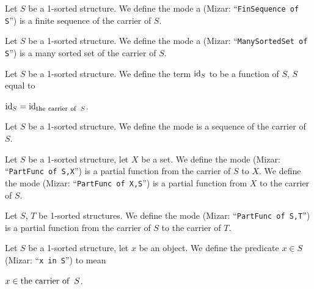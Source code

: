 \documentclass{article}
\begin{document}
\begin{definition}
Let $S$ be a 1-sorted structure.
We define the mode a 
(Mizar: ``\verb#FinSequence of S#'')
is a finite sequence of the carrier of $S$.
\end{definition}

\begin{definition}
Let $S$ be a 1-sorted structure.
We define the mode a  (Mizar:
``\verb#ManySortedSet of S#'') is a many sorted set of the carrier of $S$.
\end{definition}

\begin{definition}
Let $S$ be a 1-sorted structure.
We define the term $\operatorname{id}_{S}$ to be a function of $S$, $S$ equal to
\begin{defn}
\item $\operatorname{id}_{S}=\operatorname{id}_{\operatorname{the\ carrier\ of\ }S}$.
\end{defn}
\end{definition}

\begin{definition}
Let $S$ be a 1-sorted structure.
We define the mode  is a sequence of the carrier
of $S$.
\end{definition}

\begin{definition}
Let $S$ be a 1-sorted structure, let $X$ be a set.
We define the mode  (Mizar:
``\verb#PartFunc of S,X#'') is a partial function from the carrier of
$S$ to $X$.
We define the mode  (Mizar:
``\verb#PartFunc of X,S#'') is a partial function from $X$ to the carrier of
$S$.
\end{definition}

\begin{definition}
Let $S$, $T$ be 1-sorted structures.
We define the mode 
(Mizar: ``\verb#PartFunc of S,T#'') is a partial function from the carrier of
$S$ to the carrier of $T$.
\end{definition}

\begin{definition}
Let $S$ be a 1-sorted structure, let $x$ be an object.
We define the predicate $x\in S$ (Mizar: ``\verb#x in S#'') to mean
\begin{defn}
\item $x\in\operatorname{the\ carrier\ of\ }S$.
\end{defn}
\end{definition}
\end{document}
